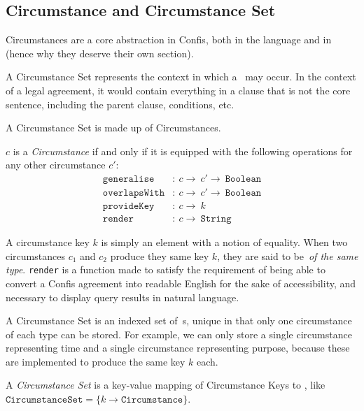 \subsection{Circumstance and Circumstance Set}\label{subsec:circumstance}

Circumstances are a core abstraction in Confis, both in the language and in~ (hence why they deserve their own section).

A Circumstance Set represents the context in which a~ may occur.
In the context of a legal agreement, it would contain everything in a clause that is not the core sentence, including the parent clause, conditions, etc.

A Circumstance Set is made up of Circumstances.


\begin{definition}[Circumstance]
    \label{def:circumstance}
    $c$ is a \emph{Circumstance} if and only if it is equipped with the following operations for any other circumstance $c'$:
    \begin{align}
        \label{def:c:generalise}
        \texttt{generalise}&: \ c \to\ c' \to\ \texttt{Boolean}\\
        \label{def:c:overlap}
        \texttt{overlapsWith}&:\ c \to\ c' \to\ \texttt{Boolean}\\
        \label{def:c:provideKey}
        \texttt{provideKey}&: \ c \to\ k\\
        \label{def:c:render}
        \texttt{render}&: \ c \to\ \texttt{String}
    \end{align}
\end{definition}

A circumstance key $k$ is simply an element with a notion of equality.
When two circumstances $c_1$ and $c_2$ produce they same key $k$, they are said to be~\emph{of the same type}.
\texttt{render} is a function made to satisfy the requirement of being able to convert a Confis agreement into readable English for the sake of accessibility, and necessary to display query results in natural language.

A Circumstance Set is an indexed set of~s, unique in that only one circumstance of each type can be stored.
For example, we can only store a single circumstance representing time and a single circumstance representing purpose, because these are implemented to produce the same key $k$ each.

\begin{definition}
    \label{def:circumstanceSet}
    A \emph{Circumstance Set} is a key-value mapping of Circumstance Keys to , like $\texttt{CircumstanceSet} = \{ k \to \texttt{Circumstance} \}$.
\end{definition}

